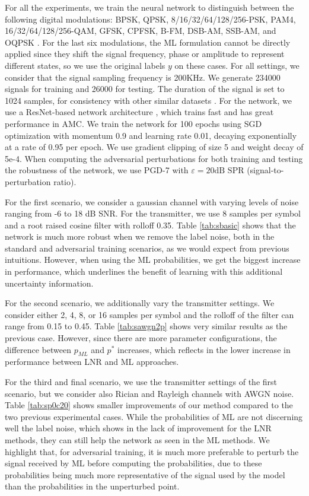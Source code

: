 \documentclass[conference]{IEEEtran}
\begin{document}
For all the experiments, we train the neural network to distinguish between the following digital modulations: BPSK, QPSK, 8/16/32/64/128/256-PSK, PAM4, 16/32/64/128/256-QAM, GFSK, CPFSK, B-FM, DSB-AM, SSB-AM, and OQPSK \cite{Rajendran_Meert_Giustiniano_Lenders_Pollin_2018,Guo_Jiang_Wu_Zhou_2020}. For the last six modulations, the ML formulation cannot be directly applied since they shift the signal frequency, phase or amplitude to represent different states, so we use the original labels $y$ on these cases.
For all settings, we consider that the signal sampling frequency is 200KHz. We generate 234000 signals for training and 26000 for testing. The duration of the signal is set to 1024 samples, for consistency with other similar datasets \cite{OShea_West_2016}. For the network, we use a ResNet-based network architecture \cite{OShea_Roy_Clancy_2018}, which trains fast and has great performance in AMC. We train the network for 100 epochs using SGD optimization with momentum 0.9 and learning rate 0.01, decaying exponentially at a rate of 0.95 per epoch. We use gradient clipping of size 5 and weight decay of 5e-4. When computing the adversarial perturbations for both training and testing the robustness of the network, we use PGD-7 \cite{Madry_Makelov_Schmidt_Tsipras_Vladu_2019} with $\varepsilon=20 \text{dB SPR}$ (signal-to-perturbation ratio).

For the first scenario, we consider a gaussian channel with varying levels of noise ranging from -6 to 18 dB SNR. For the transmitter, we use 8 samples per symbol and a root raised cosine filter with rolloff 0.35. Table \ref{tab:sbasic} shows that the network is much more robust when we remove the label noise, both in the standard and adversarial training scenarios, as we would expect from previous intuitions. However, when using the ML probabilities, we get the biggest increase in performance, which underlines the benefit of learning with this additional uncertainty information.

For the second scenario, we additionally vary the transmitter settings. We consider either 2, 4, 8, or 16 samples per symbol and the rolloff of the filter can range from 0.15 to 0.45. Table \ref{tab:sawgn2p} shows very similar results as the previous case. However, since there are more parameter configurations, the difference between $p_{ML}$ and $p^{*}$ increases, which reflects in the lower increase in performance between LNR and ML approaches.

For the third and final scenario, we use the transmitter settings of the first scenario, but we consider also Rician and Rayleigh channels with AWGN noise. Table \ref{tab:sp0c20} shows smaller improvements of our method compared to the two previous experimental cases. While the probabilities of ML are not discerning well the label noise, which shows in the lack of improvement for the LNR methods, they can still help the network as seen in the ML methods. We highlight that, for adversarial training, 
it is much more preferable to perturb the signal received by ML before computing the probabilities, due to these probabilities being much more representative of the signal used by the model than the probabilities in the unperturbed point.
\end{document}
